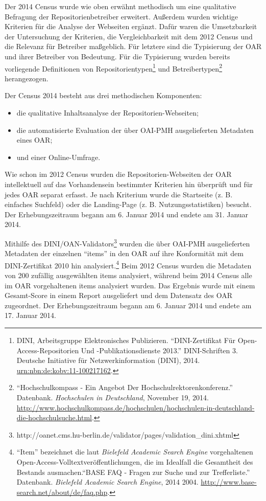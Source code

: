 \documentclass[a4paper,
fontsize=11pt,
oneside,
numbers=noperiodatend,
parskip=half-,
bibliography=totoc,
final
]{scrartcl}
\begin{document}
Der 2014 Census wurde wie oben erwähnt methodisch um eine qualitative
Befragung der Repositorienbetreiber erweitert. Außerdem wurden wichtige
Kriterien für die Analyse der Webseiten ergänzt. Dafür waren die
Umsetzbarkeit der Untersuchung der Kriterien, die Vergleichbarkeit mit
dem 2012 Census und die Relevanz für Betreiber maßgeblich. Für letztere
sind die Typisierung der OAR und ihrer Betreiber von Bedeutung. Für die
Typisierung wurden bereits vorliegende Definitionen von
Repositorientypen\footnote{DINI, Arbeitsgruppe Elektronisches
  Publizieren. \enquote{DINI-Zertifikat Für Open-Access-Repositorien Und
  -Publikationsdienste 2013.} DINI-Schriften 3. Deutsche Initiative für
  Netzwerkinformation (DINI), 2014.
  \href{http://nbn-resolving.de/urn:nbn:de:kobv:11-100217162}{urn:nbn:de:kobv:11-100217162}.}
und Betreibertypen\footnote{\enquote{Hochschulkompass - Ein Angebot Der
  Hochschulrektorenkonferenz.} Datenbank. \emph{Hochschulen in
  Deutschland}, November 19, 2014.
  \url{http://www.hochschulkompass.de/hochschulen/hochschulen-in-deutschland-die-hochschulsuche.html}.}
herangezogen.

Der Census 2014 besteht aus drei methodischen Komponenten:

\begin{itemize}
\item
  die qualitative Inhaltsanalyse der Repositorien-Webseiten;
\item
  die automatisierte Evaluation der über OAI-PMH ausgelieferten
  Metadaten eines OAR;
\item
  und einer Online-Umfrage.
\end{itemize}

Wie schon im 2012 Census wurden die Repositorien-Webseiten der OAR
intellektuell auf das Vorhandensein bestimmter Kriterien hin überprüft
und für jedes OAR separat erfasst. Je nach Kriterium wurde die
Startseite (z. B. einfaches Suchfeld) oder die Landing-Page (z. B.
Nutzungsstatistiken) besucht. Der Erhebungszeitraum begann am 6. Januar
2014 und endete am 31. Januar 2014.

Mithilfe des DINI/OAN-Validators\footnote{http://oanet.cms.hu-berlin.de/validator/pages/validation\_dini.xhtml}
wurden die über OAI-PMH ausgelieferten Metadaten der einzelnen
\enquote{items} in den OAR auf ihre Konformität mit dem DINI-Zertifikat
2010 hin analysiert.\footnote{\enquote{Item} bezeichnet die laut
  \emph{Bielefeld Academic Search Engine} vorgehaltenen
  Open-Access-Volltextveröffentlichungen, die im Idealfall die
  Gesamtheit des Bestands ausmachen.\enquote{BASE FAQ - Fragen zur Suche
  und zur Trefferliste.} Datenbank. \emph{Bielefeld Academic Search
  Engine}, 2014 2004. \url{http://www.base-search.net/about/de/faq.php}.}
Beim 2012 Census wurden die Metadaten von 200 zufällig ausgewählten
items analysiert, während beim 2014 Census alle im OAR vorgehaltenen
items analysiert wurden. Das Ergebnis wurde mit einem Gesamt-Score in
einem Report ausgeliefert und dem Datensatz des OAR zugeordnet. Der
Erhebungszeitraum begann am 6. Januar 2014 und endete am 17. Januar
2014.
\end{document}
